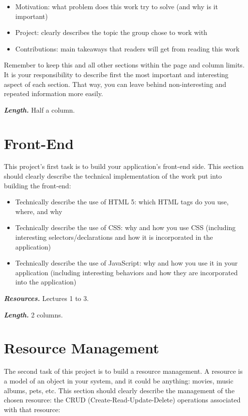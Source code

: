 \documentclass[letterpaper,twocolumn]{article}
\newcommand{\myparagraph}[1]{\vspace{0.1cm}\noindent \textbf{\textit{#1.}}}
\begin{document}
\begin{itemize}
    \item Motivation: what problem does this work try to solve (and why is it important)
    \item Project: clearly describes the topic the group chose to work with
    \item Contributions: main takeaways that readers will get from reading this work
\end{itemize}


Remember to keep this and all other sections within the page and column limits.
It is your responsibility to describe first the most important and interesting aspect of each section.
That way, you can leave behind non-interesting and repeated information more easily.

\myparagraph{Length} Half a column.

\section{Front-End}

This project's first task is to build your application's front-end side.
This section should clearly describe the technical implementation of the work put into building the front-end:

\begin{itemize}
    \item Technically describe the use of HTML 5: which HTML tags do you use, where, and why
    \item Technically describe the use of CSS: why and how you use CSS (including interesting selectors/declarations and how it is incorporated in the application)
    \item Technically describe the use of JavaScript: why and how you use it in your application (including interesting behaviors and how they are incorporated into the application)
\end{itemize}

\myparagraph{Resources} Lectures 1 to 3.

\myparagraph{Length} 2 columns.

\section{Resource Management}

The second task of this project is to build a resource management.
A resource is a model of an object in your system, and it could be anything: movies, music albums, pets, etc.
This section should clearly describe the management of the chosen resource: the CRUD (Create-Read-Update-Delete) operations associated with that resource:
\end{document}
